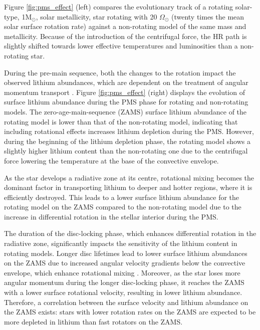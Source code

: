 Figure \ref{fig:pms_effect} (left) compares the evolutionary track of a rotating solar-type, 1M$_{\odot}$, solar metallicity, star rotating with 20 $\Omega_{\odot}$ (twenty times the mean solar surface rotation rate) against a non-rotating model of the same mass and metallicity. 
Because of the introduction of the centrifugal force, the HR path is slightly shifted towards lower effective temperatures and luminosities than a non-rotating star.

During the pre-main sequence, both the changes to the rotation impact the observed lithium abundances, which are dependent on the treatment of angular momentum transport \citep{dumont_lithium_2021}.
Figure \ref{fig:pms_effect} (right) displays the evolution of surface lithium abundance during the PMS phase for rotating and non-rotating models. 
The zero-age-main-sequence (ZAMS) surface lithium abundance of the rotating model is lower than that of the non-rotating model, indicating that including rotational effects increases lithium depletion during the PMS. 
However, during the beginning of the lithium depletion phase, the rotating model shows a slightly higher lithium content than the non-rotating one due to the centrifugal force lowering the temperature at the base of the convective envelope.

As the star develops a radiative zone at its centre, rotational mixing becomes the dominant factor in transporting lithium to deeper and hotter regions, where it is efficiently destroyed. 
This leads to a lower surface lithium abundance for the rotating model on the ZAMS compared to the non-rotating model due to the increase in differential rotation in the stellar interior during the PMS.

The duration of the disc-locking phase, which enhances differential rotation in the radiative zone, significantly impacts the sensitivity of the lithium content in rotating models. 
Longer disc lifetimes lead to lower surface lithium abundances on the ZAMS due to increased angular velocity gradients below the convective envelope, which enhance rotational mixing \citep{eggenberger_angular_2012}. 
Moreover, as the star loses more angular momentum during the longer disc-locking phase, it reaches the ZAMS with a lower surface rotational velocity, resulting in lower lithium abundance.
Therefore, a correlation between the surface velocity and lithium abundance on the ZAMS exists: stars with lower rotation rates on the ZAMS are expected to be more depleted in lithium than fast rotators on the ZAMS.

